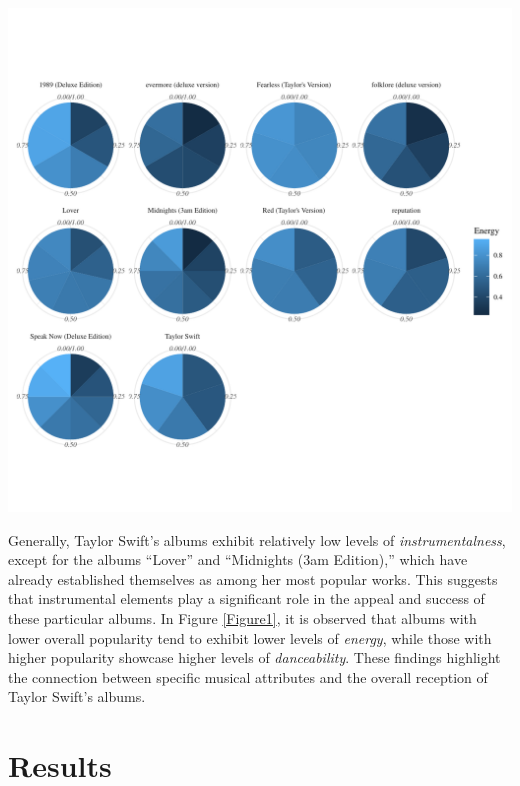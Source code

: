 \documentclass[11pt,preprint, authoryear]{elsarticle}
\let\origfigure\figure
\let\endorigfigure\endfigure
\renewenvironment{figure}[1][2] {
    \expandafter\origfigure\expandafter[H]
} {
    \endorigfigure
}
\numberwithin{equation}{section}
\numberwithin{figure}{section}
\numberwithin{table}{section}
\begin{document}
\begin{figure}[H]

{\centering \includegraphics[angle=90]{Taylor-Swift-Report_files/figure-latex/Figure3-3} 

}

\caption{Common Characteristics of Top 5 Songs Concentration \label{Figure3}}\label{fig:Figure3-3}
\end{figure}

Generally, Taylor Swift's albums exhibit relatively low levels of
\emph{instrumentalness}, except for the albums ``Lover'' and ``Midnights
(3am Edition),'' which have already established themselves as among her
most popular works. This suggests that instrumental elements play a
significant role in the appeal and success of these particular albums.
In Figure \ref{Figure1}, it is observed that albums with lower overall
popularity tend to exhibit lower levels of \emph{energy}, while those
with higher popularity showcase higher levels of \emph{danceability}.
These findings highlight the connection between specific musical
attributes and the overall reception of Taylor Swift's albums.

\hypertarget{results}{%
\section{\texorpdfstring{Results
\label{Results}}{Results }}\label{results}}
\end{document}
